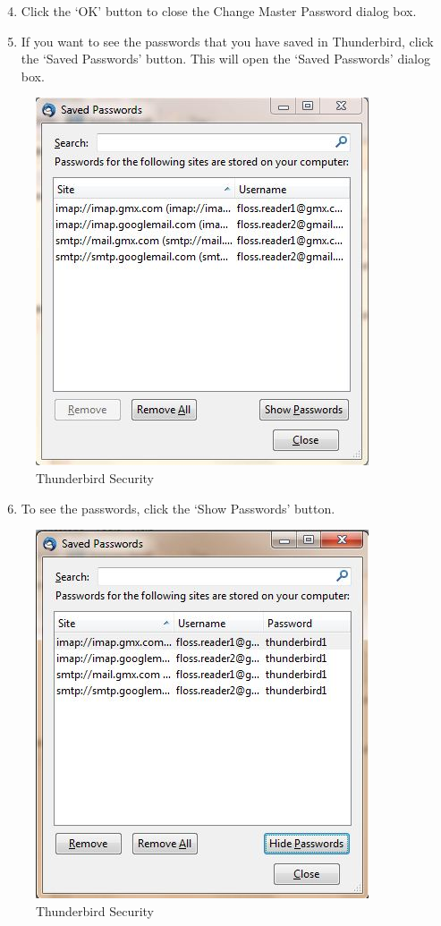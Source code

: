 \begin{enumerate}[1.]
\setcounter{enumi}{3}
\item
  Click the `OK' button to close the Change Master Password dialog box.
\item
  If you want to see the passwords that you have saved in Thunderbird,
  click the `Saved Passwords' button. This will open the `Saved
  Passwords' dialog box.
\end{enumerate}
\begin{figure}[htbp]
\centering
\includegraphics{thunderbird_sec_6.jpg}
\caption{Thunderbird Security}
\end{figure}

\begin{enumerate}[1.]
\setcounter{enumi}{5}
\item
  To see the passwords, click the `Show Passwords' button.
\end{enumerate}
\begin{figure}[htbp]
\centering
\includegraphics{thunderbird_sec_7.jpg}
\caption{Thunderbird Security}
\end{figure}

